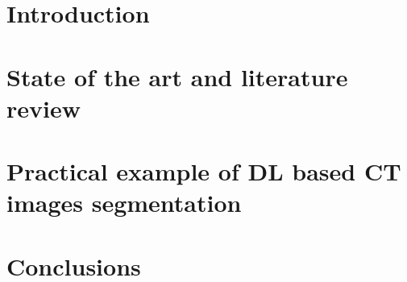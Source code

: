 \chapter{Introduction}


\chapter{State of the art and literature review}



%

\chapter{Practical example of DL based CT images segmentation}


\chapter{Conclusions}
\label{ch:podsumowanie}

